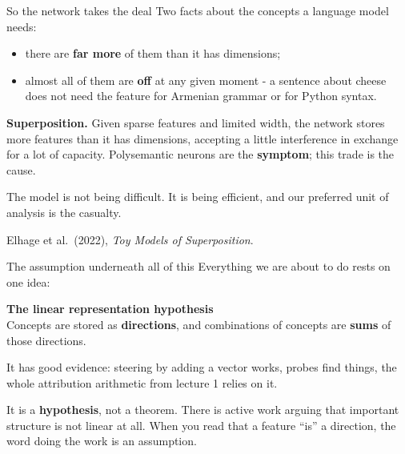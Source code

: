 \documentclass[aspectratio=169]{beamer}
\newcommand{\keybox}[1]{%
  \begin{tcolorbox}[colback=armblue!8, colframe=armblue, boxrule=0.6pt, arc=2pt]
  #1
  \end{tcolorbox}}
\newcommand{\takebox}[1]{%
  \begin{tcolorbox}[colback=paramgreen!8, colframe=paramgreen, boxrule=0.6pt, arc=2pt]
  #1
  \end{tcolorbox}}
\newcommand{\watchbox}[1]{%
  \begin{tcolorbox}[colback=armorange!12, colframe=armorange, boxrule=0.6pt, arc=2pt]
  #1
  \end{tcolorbox}}
\begin{document}
\begin{frame}{So the network takes the deal}
  \vspace{0.7em}
  Two facts about the concepts a language model needs:

  \vspace{0.5em}
  \begin{itemize}
    \item there are \textbf{far more} of them than it has dimensions;
    \item almost all of them are \textbf{off} at any given moment - a sentence about cheese does
      not need the feature for Armenian grammar or for Python syntax.
  \end{itemize}

  \vspace{0.6em}
  \keybox{\small \textbf{Superposition.} Given sparse features and limited width, the network
  stores more features than it has dimensions, accepting a little interference in exchange for a
  lot of capacity. Polysemantic neurons are the \textbf{symptom}; this trade is the cause.}

  \vspace{0.4em}
  \takebox{\small The model is not being difficult. It is being efficient, and our preferred unit
  of analysis is the casualty.}

  \vspace{0.2em}
  {\footnotesize Elhage et al.\ (2022), \emph{Toy Models of Superposition}.}
\end{frame}

\begin{frame}{The assumption underneath all of this}
  \vspace{0.9em}
  Everything we are about to do rests on one idea:

  \vspace{0.7em}
  \begin{center}
  \begin{tcolorbox}[colback=armblue!8, colframe=armblue, boxrule=0.8pt, arc=3pt,
                    width=0.88\textwidth]
    \centering\large
    \textbf{The linear representation hypothesis}\\[0.5em]
    Concepts are stored as \textbf{directions}, and combinations of concepts are
    \textbf{sums} of those directions.
  \end{tcolorbox}
  \end{center}

  \vspace{0.9em}
  It has good evidence: steering by adding a vector works, probes find things, the whole
  attribution arithmetic from lecture 1 relies on it.

  \vspace{0.8em}
  \watchbox{It is a \textbf{hypothesis}, not a theorem. There is active work arguing that
  important structure is not linear at all. When you read that a feature ``is'' a direction, the
  word doing the work is an assumption.}
\end{frame}
\end{document}
